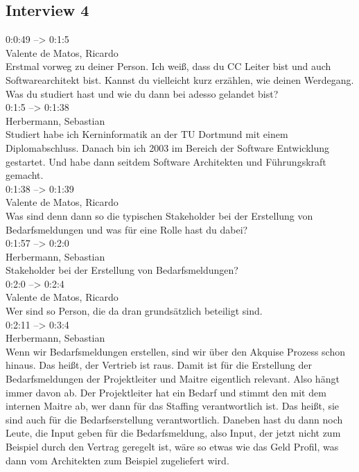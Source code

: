 \subsection{Interview 4}
\label{interview4}
0:0:49 --> 0:1:5\\
Valente de Matos, Ricardo\\
Erstmal vorweg zu deiner Person. Ich weiß, dass du CC Leiter bist und auch Softwarearchitekt bist. Kannst du vielleicht kurz erzählen, wie deinen Werdegang. Was du studiert hast und wie du dann bei adesso gelandet bist?\\

0:1:5 --> 0:1:38\\
Herbermann, Sebastian\\
Studiert habe ich Kerninformatik an der TU Dortmund mit einem Diplomabschluss. Danach bin ich 2003 im Bereich der Software Entwicklung gestartet. Und habe dann seitdem Software Architekten und Führungskraft gemacht.\\

0:1:38 --> 0:1:39\\
Valente de Matos, Ricardo\\
Was sind denn dann so die typischen Stakeholder bei der Erstellung von Bedarfsmeldungen und was für eine Rolle hast du dabei?\\

0:1:57 --> 0:2:0\\
Herbermann, Sebastian\\
Stakeholder bei der Erstellung von Bedarfsmeldungen?\\

0:2:0 --> 0:2:4\\
Valente de Matos, Ricardo\\
Wer sind so Person, die da dran grundsätzlich beteiligt sind.\\

0:2:11 --> 0:3:4\\
Herbermann, Sebastian\\
Wenn wir Bedarfsmeldungen erstellen, sind wir über den Akquise Prozess schon hinaus. Das heißt, der Vertrieb ist raus. Damit ist für die Erstellung der Bedarfsmeldungen der Projektleiter und Maitre eigentlich relevant. Also hängt immer davon ab. Der Projektleiter hat ein Bedarf und stimmt den mit dem internen Maitre ab, wer dann für das Staffing verantwortlich ist. Das heißt, sie sind auch für die Bedarfserstellung verantwortlich. Daneben hast du dann noch Leute, die Input geben für die Bedarfsmeldung, also Input, der jetzt nicht zum Beispiel durch den Vertrag geregelt ist, wäre so etwas wie das Geld Profil, was dann vom Architekten zum Beispiel zugeliefert wird.\\

